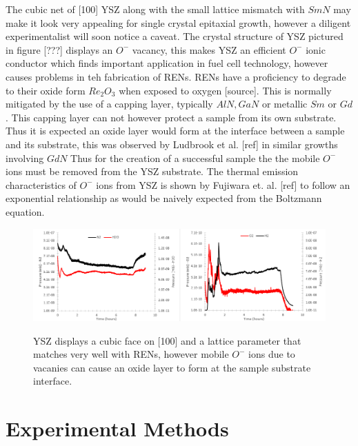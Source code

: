 \documentclass[11pt]{article}
\begin{document}
The cubic net of [100] YSZ along with the small lattice mismatch with $SmN$ may make it look very appealing for single crystal epitaxial growth, however a diligent experimentalist will soon notice a caveat. The crystal structure of YSZ pictured in figure [???] displays an $O^-$ vacancy, this makes YSZ an efficient $O^-$ ionic conductor which finds important application in fuel cell technology, however causes problems in teh fabrication of RENs. RENs have a proficiency to degrade to their oxide form $Re_2O_3$ when exposed to oxygen [source]. This is normally mitigated by the use of a capping layer, typically $AlN, GaN$ or metallic $Sm$ or $Gd$. This capping layer can not however protect a sample from its own substrate. Thus it is expected an oxide layer would form at the interface between a sample and its substrate, this
was observed by Ludbrook et al. [ref] in similar growths involving $GdN$ Thus for the creation of a successful sample the the mobile $O^-$ ions must be removed from the YSZ substrate. The thermal emission characteristics of $O^-$ ions from YSZ is shown by Fujiwara et. al. [ref] to follow an exponential relationship as would be naively expected from the Boltzmann equation. 

\begin{figure}[t!]
\centering
\includegraphics[width=1\linewidth]{PP_vs_time_1.PNG}
\label{fig:boat1}
\caption{YSZ displays a cubic face on [100] and a lattice parameter that matches very well with RENs, however mobile $O^-$ ions due to vacanies can cause an oxide layer to form at the sample substrate interface.}
\end{figure}

\section{Experimental Methods}
\end{document}

